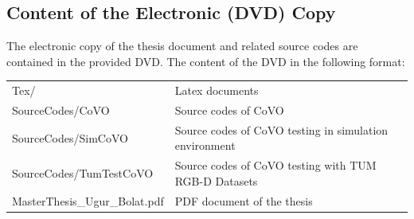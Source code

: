 \documentclass[12pt]{report}
\numberwithin{figure}{section}
\begin{document}
\begin{appendices}
\newpage

\section{Content of the Electronic (DVD) Copy}\label{sc_dvd}

The electronic copy of the thesis document and related source codes are 
contained in the provided DVD. The content of the DVD in the following format:


{\renewcommand{\arraystretch}{2} 
\begin{table}[H]
	\centering
\begin{tabular}{l m{7cm}}

Tex/ & Latex documents\\
SourceCodes/CoVO & Source codes of CoVO \\
SourceCodes/SimCoVO & Source codes of CoVO testing in simulation environment \\
SourceCodes/TumTestCoVO & Source codes of CoVO testing with TUM RGB-D Datasets 
\\
MasterThesis\_Ugur\_Bolat.pdf & PDF document of the thesis
\end{tabular}
\end{table}}

\end{appendices}

\printbibliography[heading=bibintoc]



\end{document}
